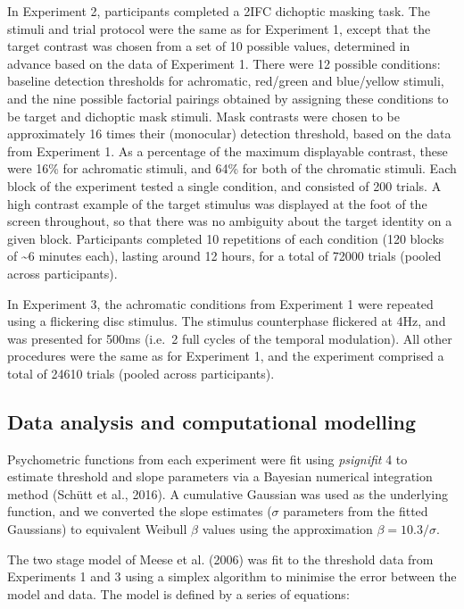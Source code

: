 \documentclass[
]{article}
\begin{document}
In Experiment 2, participants completed a 2IFC dichoptic masking task. The stimuli and trial protocol were the same as for Experiment 1, except that the target contrast was chosen from a set of 10 possible values, determined in advance based on the data of Experiment 1. There were 12 possible conditions: baseline detection thresholds for achromatic, red/green and blue/yellow stimuli, and the nine possible factorial pairings obtained by assigning these conditions to be target and dichoptic mask stimuli. Mask contrasts were chosen to be approximately 16 times their (monocular) detection threshold, based on the data from Experiment 1. As a percentage of the maximum displayable contrast, these were 16\% for achromatic stimuli, and 64\% for both of the chromatic stimuli. Each block of the experiment tested a single condition, and consisted of 200 trials. A high contrast example of the target stimulus was displayed at the foot of the screen throughout, so that there was no ambiguity about the target identity on a given block. Participants completed 10 repetitions of each condition (120 blocks of \textasciitilde6 minutes each), lasting around 12 hours, for a total of 72000 trials (pooled across participants).

In Experiment 3, the achromatic conditions from Experiment 1 were repeated using a flickering disc stimulus. The stimulus counterphase flickered at 4Hz, and was presented for 500ms (i.e.~2 full cycles of the temporal modulation). All other procedures were the same as for Experiment 1, and the experiment comprised a total of 24610 trials (pooled across participants).

\hypertarget{data-analysis-and-computational-modelling}{%
\subsection{Data analysis and computational modelling}\label{data-analysis-and-computational-modelling}}

Psychometric functions from each experiment were fit using \emph{psignifit} 4 to estimate threshold and slope parameters via a Bayesian numerical integration method (Schütt et al., 2016). A cumulative Gaussian was used as the underlying function, and we converted the slope estimates (\(\sigma\) parameters from the fitted Gaussians) to equivalent Weibull \(\beta\) values using the approximation \(\beta = 10.3/\sigma\).

The two stage model of Meese et al. (2006) was fit to the threshold data from Experiments 1 and 3 using a simplex algorithm to minimise the error between the model and data. The model is defined by a series of equations:
\end{document}

